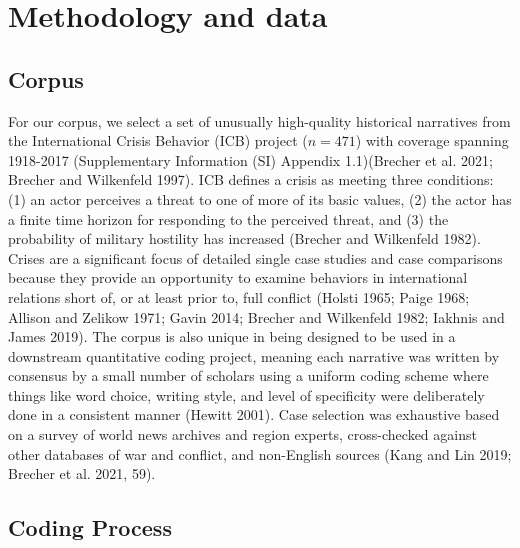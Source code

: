 \documentclass{article}
\begin{document}
\hypertarget{methodology-and-data}{%
\section{Methodology and data}\label{methodology-and-data}}

\hypertarget{corpus}{%
\subsection{Corpus}\label{corpus}}

For our corpus, we select a set of unusually high-quality historical
narratives from the International Crisis Behavior (ICB) project
(\(n=471\)) with coverage spanning 1918-2017 (Supplementary Information
(SI) Appendix 1.1)(Brecher et al. 2021; Brecher and Wilkenfeld 1997).
ICB defines a crisis as meeting three conditions: (1) an actor perceives
a threat to one of more of its basic values, (2) the actor has a finite
time horizon for responding to the perceived threat, and (3) the
probability of military hostility has increased (Brecher and Wilkenfeld
1982). Crises are a significant focus of detailed single case studies
and case comparisons because they provide an opportunity to examine
behaviors in international relations short of, or at least prior to,
full conflict (Holsti 1965; Paige 1968; Allison and Zelikow 1971; Gavin
2014; Brecher and Wilkenfeld 1982; Iakhnis and James 2019). The corpus
is also unique in being designed to be used in a downstream quantitative
coding project, meaning each narrative was written by consensus by a
small number of scholars using a uniform coding scheme where things like
word choice, writing style, and level of specificity were deliberately
done in a consistent manner (Hewitt 2001). Case selection was exhaustive
based on a survey of world news archives and region experts,
cross-checked against other databases of war and conflict, and
non-English sources (Kang and Lin 2019; Brecher et al. 2021, 59).

\hypertarget{coding-process}{%
\subsection{Coding Process}\label{coding-process}}
\end{document}
